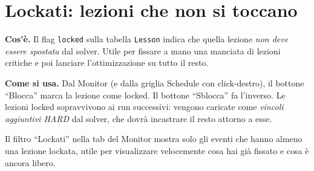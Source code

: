 \section{Lockati: lezioni che non si toccano}

\textbf{Cos'\`e.} Il flag \texttt{locked} sulla tabella
\texttt{Lesson} indica che quella lezione \emph{non deve
essere spostata} dal solver. Utile per fissare a mano una
manciata di lezioni critiche e poi lanciare l'ottimizzazione
su tutto il resto.

\textbf{Come si usa.} Dal Monitor (e dalla griglia Schedule
con click-destro), il bottone ``Blocca'' marca la lezione
come locked. Il bottone ``Sblocca'' fa l'inverso. Le lezioni
locked sopravvivono ai run successivi: vengono caricate come
\emph{vincoli aggiuntivi HARD} dal solver, che dovr\`a
incastrare il resto attorno a esse.

Il filtro ``Lockati'' nella tab del Monitor mostra solo gli
eventi che hanno almeno una lezione lockata, utile per
visualizzare velocemente cosa hai gi\`a fissato e cosa \`e
ancora libero.

